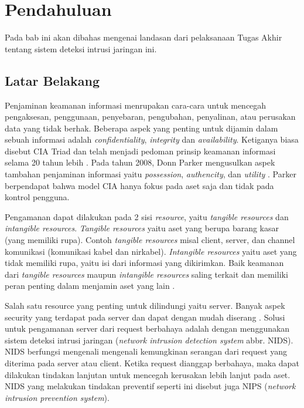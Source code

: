 \chapter{Pendahuluan}

Pada bab ini akan dibahas mengenai landasan dari pelaksanaan Tugas Akhir tentang sistem deteksi intrusi jaringan ini.

\section{Latar Belakang}

Penjaminan keamanan informasi menrupakan cara-cara untuk mencegah pengaksesan, penggunaan, penyebaran, pengubahan, penyalinan, atau perusakan data yang tidak berhak. Beberapa aspek yang penting untuk dijamin dalam sebuah informasi adalah \emph{confidentiality}, \emph{integrity} dan \emph{availability}. Ketiganya biasa disebut CIA Triad dan telah menjadi pedoman prinsip keamanan informasi selama 20 tahun lebih \parencite{perrin2008}. Pada tahun 2008, Donn Parker mengusulkan aspek tambahan penjaminan informasi yaitu \emph{possession}, \emph{authencity}, dan \emph{utility} \parencite{parker1998}. Parker berpendapat bahwa model CIA hanya fokus pada aset saja dan tidak pada kontrol pengguna.

Pengamanan dapat dilakukan pada 2 sisi \emph{resource}, yaitu \emph{tangible resources} dan \emph{intangible resources}. \emph{Tangible resources} yaitu aset yang berupa barang kasar (yang memiliki rupa). Contoh \emph{tangible resources} misal client, server, dan channel komunikasi (komunikasi kabel dan nirkabel). \emph{Intangible resources} yaitu aset yang tidak memiliki rupa, yaitu isi dari informasi yang dikirimkan. Baik keamanan dari \emph{tangible resources} maupun \emph{intangible resources} saling terkait dan memiliki peran penting dalam menjamin aset yang lain \parencite{kizza2013}.

Salah satu resource yang penting untuk dilindungi yaitu server. Banyak aspek security yang terdapat pada server dan dapat dengan mudah diserang \parencite{owasp2013}. Solusi untuk pengamanan server dari request berbahaya adalah dengan menggunakan sistem deteksi intrusi jaringan (\emph{network intrusion detection system} abbr. NIDS). NIDS berfungsi mengenali mengenali kemungkinan serangan dari request yang diterima pada server atau client. Ketika request dianggap berbahaya, maka dapat dilakukan tindakan lanjutan untuk mencegah kerusakan lebih lanjut pada aset. NIDS yang melakukan tindakan preventif seperti ini disebut juga NIPS (\emph{network intrusion prevention system}).

